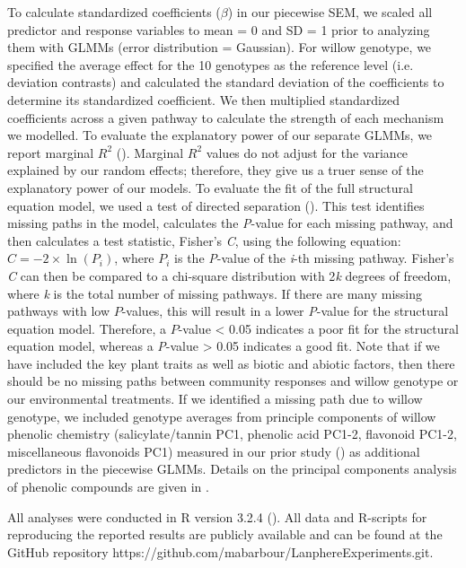 \documentclass[11pt]{article}
\begin{document}
To calculate standardized coefficients ($\beta$) in our piecewise SEM, we scaled
all predictor and response variables to mean = 0 and SD = 1 prior to
analyzing them with GLMMs (error distribution = Gaussian). For willow
genotype, we specified the average effect for the 10 genotypes as the
reference level (i.e. deviation contrasts) and calculated the standard
deviation of the coefficients to determine its standardized coefficient.
We then multiplied standardized coefficients across a given pathway to
calculate the strength of each mechanism we modelled. To evaluate the
explanatory power of our separate GLMMs, we report marginal
\(R^2\) (\citealt{Nakagawa_2012}). Marginal \(R^2\) values do
not adjust for the variance explained by our random effects; therefore,
they give us a truer sense of the explanatory power of our models. To
evaluate the fit of the full structural equation model, we used a test
of directed separation (\citealt{shipley2000new}). This test identifies missing
paths in the model, calculates the \emph{P}-value for each missing
pathway, and then calculates a test statistic, Fisher's \emph{C}, using
the following equation: \(C=-2\times\ln\left(P_i\right)\), where \(P_i\) is the
\emph{P}-value of the \emph{i}-th missing pathway. Fisher's \emph{C} can
then be compared to a chi-square distribution with 2\emph{k} degrees of
freedom, where \emph{k} is the total number of missing pathways. If
there are many missing pathways with low $P$-values, this will result in a
lower \emph{P}-value for the structural equation model. Therefore, a
$P$-value \textless{} 0.05 indicates a poor fit for the structural
equation model, whereas a \emph{P}-value \textgreater{} 0.05 indicates a
good fit. Note that if we have included the key plant traits as well as
biotic and abiotic factors, then there should be no missing paths between community responses and willow genotype or our environmental treatments. If we identified a missing path due to willow genotype, we included genotype averages from principle components of willow phenolic chemistry (salicylate/tannin PC1, phenolic acid PC1-2, flavonoid PC1-2, miscellaneous flavonoids PC1) measured in our prior study (\citealt{Barbour_2015}) as additional predictors in the piecewise GLMMs. Details on the principal components analysis of phenolic compounds are given in \cite{Barbour_2015}. 

All analyses were conducted in R version 3.2.4 (\citealt{R2016}). All data and R-scripts for reproducing the reported results are publicly available and can be found at the GitHub repository https://github.com/mabarbour/Lanphere\textunderscore Experiments.git. 
 
\end{document}
